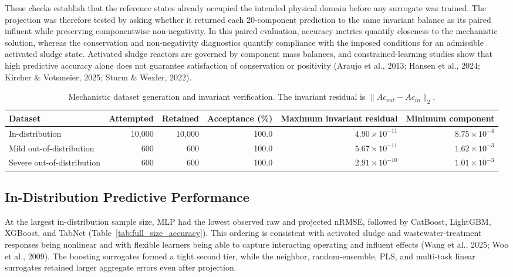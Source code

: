 \documentclass[a4paper,fleqn]{cas-sc}
\newcommand{\csvcomma}{,}
\begin{document}
These checks establish that the reference states already occupied the intended physical domain before any surrogate was trained. The projection was therefore tested by asking whether it returned each 20-component prediction to the same invariant balance as its paired influent while preserving componentwise non-negativity. In this paired evaluation, accuracy metrics quantify closeness to the mechanistic solution, whereas the conservation and non-negativity diagnostics quantify compliance with the imposed conditions for an admissible activated sludge state. Activated sludge reactors are governed by component mass balances, and constrained-learning studies show that high predictive accuracy alone does not guarantee satisfaction of conservation or positivity (Araujo et al., 2013; Hansen et al., 2024; Kircher \& Votsmeier, 2025; Sturm \& Wexler, 2022).

\FloatBarrier
\begin{table}[H]
\centering
\caption{Mechanistic dataset generation and invariant verification. The invariant residual is $\|Ac_{out}-Ac_{in}\|_2$.}
\label{tab:dataset_validation}
\scriptsize
\begin{tabular}{lrrrrr}
\toprule
Dataset & Attempted & Retained & Acceptance (\%) & Maximum invariant residual & Minimum component \\
\midrule
In-distribution & 10\csvcomma{}000 & 10\csvcomma{}000 & 100.0 & $4.90\times10^{-11}$ & $8.75\times10^{-4}$ \\
Mild out-of-distribution & 600 & 600 & 100.0 & $5.67\times10^{-11}$ & $1.62\times10^{-3}$ \\
Severe out-of-distribution & 600 & 600 & 100.0 & $2.91\times10^{-10}$ & $1.01\times10^{-3}$ \\
\bottomrule
\end{tabular}
\end{table}

\subsection{In-Distribution Predictive Performance}

At the largest in-distribution sample size, MLP had the lowest observed raw and projected nRMSE, followed by CatBoost, LightGBM, XGBoost, and TabNet (Table~\ref{tab:full_size_accuracy}). This ordering is consistent with activated sludge and wastewater-treatment responses being nonlinear and with flexible learners being able to capture interacting operating and influent effects (Wang et al., 2025; Woo et al., 2009). The boosting surrogates formed a tight second tier, while the neighbor, random-ensemble, PLS, and multi-task linear surrogates retained larger aggregate errors even after projection.
\end{document}
